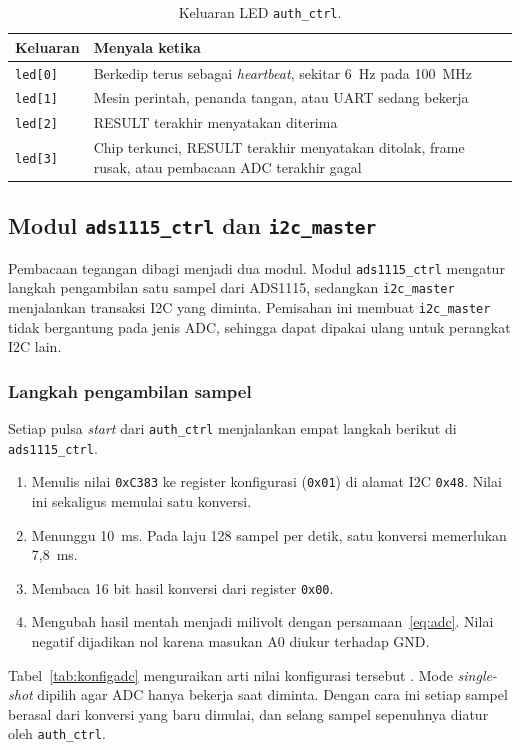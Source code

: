 \documentclass[11pt,a4paper]{article}
\begin{document}
\begin{table}[H]
  \centering
  \small
  \begin{tabularx}{\textwidth}{l X}
    \toprule
    Keluaran & Menyala ketika \\
    \midrule
    \texttt{led[0]} & Berkedip terus sebagai \textit{heartbeat}, sekitar 6~Hz pada 100~MHz \\
    \texttt{led[1]} & Mesin perintah, penanda tangan, atau UART sedang bekerja \\
    \texttt{led[2]} & RESULT terakhir menyatakan diterima \\
    \texttt{led[3]} & Chip terkunci, RESULT terakhir menyatakan ditolak, frame rusak, atau pembacaan
      ADC terakhir gagal \\
    \bottomrule
  \end{tabularx}
  \caption{Keluaran LED \texttt{auth\_ctrl}.}
  \label{tab:led}
\end{table}

\subsection{Modul \texttt{ads1115\_ctrl} dan \texttt{i2c\_master}}
\label{subsec:adc}

Pembacaan tegangan dibagi menjadi dua modul. Modul \texttt{ads1115\_ctrl} mengatur langkah
pengambilan satu sampel dari ADS1115, sedangkan \texttt{i2c\_master} menjalankan transaksi I2C
yang diminta. Pemisahan ini membuat \texttt{i2c\_master} tidak bergantung pada jenis ADC, sehingga
dapat dipakai ulang untuk perangkat I2C lain.

\subsubsection*{Langkah pengambilan sampel}

Setiap pulsa \textit{start} dari \texttt{auth\_ctrl} menjalankan empat langkah berikut di
\texttt{ads1115\_ctrl}.
\begin{enumerate}
  \item Menulis nilai \texttt{0xC383} ke register konfigurasi (\texttt{0x01}) di alamat I2C
    \texttt{0x48}. Nilai ini sekaligus memulai satu konversi.
  \item Menunggu 10~ms. Pada laju 128 sampel per detik, satu konversi memerlukan 7,8~ms.
  \item Membaca 16 bit hasil konversi dari register \texttt{0x00}.
  \item Mengubah hasil mentah menjadi milivolt dengan persamaan~\eqref{eq:adc}. Nilai negatif
    dijadikan nol karena masukan A0 diukur terhadap GND.
\end{enumerate}
Tabel~\ref{tab:konfigadc} menguraikan arti nilai konfigurasi tersebut \cite{ads1115}. Mode
\textit{single-shot} dipilih agar ADC hanya bekerja saat diminta. Dengan cara ini setiap sampel
berasal dari konversi yang baru dimulai, dan selang sampel sepenuhnya diatur oleh
\texttt{auth\_ctrl}.
\end{document}
